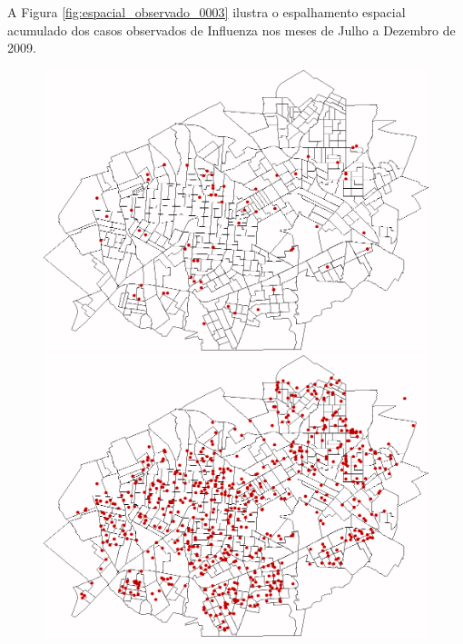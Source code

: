 A Figura \ref{fig:espacial_observado_0003} ilustra o espalhamento espacial acumulado dos casos observados de Influenza nos meses de Julho a Dezembro de 2009.

\begin{figure}[H]
  \centering
  \begin{minipage}{.45\textwidth}
    \centering
    \includegraphics[width=1.0\textwidth]{Figuras/Resultados/Observado/01-07-2009.png}
    \captionsetup{labelformat=empty}
  \end{minipage}%
  \begin{minipage}{.45\textwidth}
    \centering
    \includegraphics[width=1.0\textwidth]{Figuras/Resultados/Observado/01-08-2009.png}
    \captionsetup{labelformat=empty}

\end{minipage}
\end{figure}
